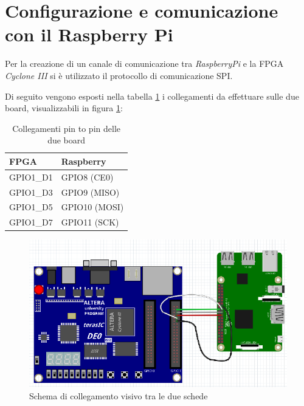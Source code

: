 \documentclass[titlepage]{report}
\begin{document}
	\section{Configurazione e comunicazione con il Raspberry Pi}
	\label{sec:configurazione_raspberrypi}
			
		Per la creazione di un canale di comunicazione tra \textit{RaspberryPi} e la FPGA \textit{Cyclone III} si è utilizzato il protocollo di comunicazione SPI.

		Di seguito vengono esposti nella tabella \ref{tab:wiring} i collegamenti da effettuare sulle due board, visualizzabili in figura \ref{fig:wiring}:

		\begin{table}[ht]
			\centering
			\begin{tabular}{|l|l|}
				\rowcolor{gray!25} %
				\hline
				\textbf{FPGA} & \textbf{Raspberry} \\
				\hline
				GPIO1\_D1 & GPIO8 (CE0) \\
				\hline
				GPIO1\_D3 & GPIO9 (MISO) \\
				\hline
				GPIO1\_D5 & GPIO10 (MOSI) \\
				\hline
				GPIO1\_D7 & GPIO11 (SCK) \\
				\hline
			\end{tabular}
			\caption{Collegamenti pin to pin delle due board}
			\label{tab:wiring}
		\end{table}

		\begin{figure}[ht]
			\centering
			\includegraphics[scale=0.6]{./img/link_fpga_raspi.png}
			\caption{Schema di collegamento visivo tra le due schede}
			\label{fig:wiring}
		\end{figure}
\end{document}
